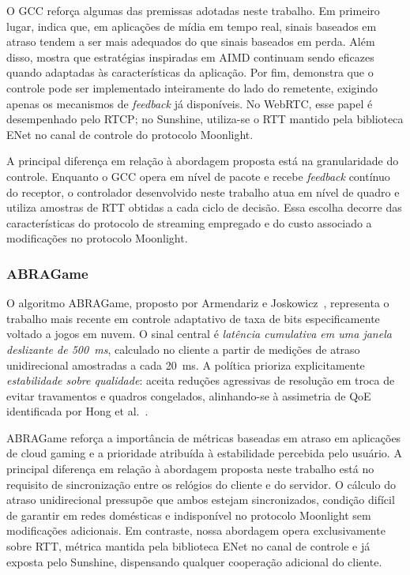 O GCC reforça algumas das premissas adotadas neste trabalho. Em primeiro lugar, indica que, em aplicações de mídia em tempo real, sinais baseados em atraso tendem a ser mais adequados do que sinais baseados em perda. Além disso, mostra que estratégias inspiradas em AIMD continuam sendo eficazes quando adaptadas às características da aplicação. Por fim, demonstra que o controle pode ser implementado inteiramente do lado do remetente, exigindo apenas os mecanismos de \emph{feedback} já disponíveis. No WebRTC, esse papel é desempenhado pelo RTCP; no Sunshine, utiliza-se o RTT mantido pela biblioteca ENet no canal de controle do protocolo Moonlight.

A principal diferença em relação à abordagem proposta está na granularidade do controle. Enquanto o GCC opera em nível de pacote e recebe \emph{feedback} contínuo do receptor, o controlador desenvolvido neste trabalho atua em nível de quadro e utiliza amostras de RTT obtidas a cada ciclo de decisão. Essa escolha decorre das características do protocolo de streaming empregado e do custo associado a modificações no protocolo Moonlight.

\subsubsection{ABRAGame}

O algoritmo ABRAGame, proposto por Armendariz e
Joskowicz~\cite{abragame}, representa o trabalho mais recente em
controle adaptativo de taxa de bits especificamente voltado a
jogos em nuvem. O sinal central é \emph{latência cumulativa em
uma janela deslizante de \SI{500}{\milli\second}}, calculado no
cliente a partir de medições de atraso unidirecional amostradas
a cada \SI{20}{\milli\second}. A política prioriza
explicitamente \emph{estabilidade sobre qualidade}: aceita
reduções agressivas de resolução em troca de evitar travamentos
e quadros congelados, alinhando-se à assimetria de QoE
identificada por Hong et al.~\cite{hong2015}.

ABRAGame reforça a importância de métricas baseadas em atraso em aplicações de cloud gaming e a prioridade atribuída à estabilidade percebida pelo usuário. A principal diferença em relação à abordagem proposta neste trabalho está no requisito de sincronização entre os relógios do cliente e do servidor. O cálculo do atraso unidirecional pressupõe que ambos estejam sincronizados, condição difícil de garantir em redes domésticas e indisponível no protocolo Moonlight sem modificações adicionais. Em contraste, nossa abordagem opera exclusivamente sobre RTT, métrica mantida pela biblioteca ENet no canal de controle e já exposta pelo Sunshine, dispensando qualquer cooperação adicional do cliente.

